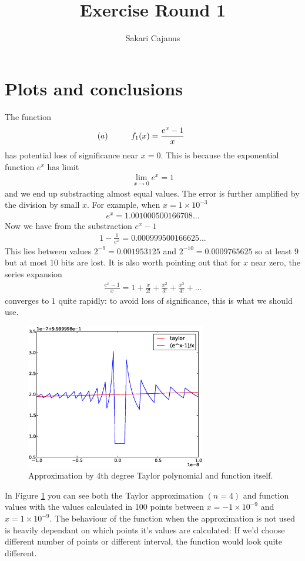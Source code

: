 \documentclass[a4paper,12pt]{scrartcl}
\author{Sakari Cajanus}
\title{Exercise Round 1}{Och samma på English}
\begin{document}
\maketitlepage
\clearpage
{}
\section{Plots and conclusions}
The function
\begin{align*}
\hspace{-10mm}(a)\hspace{10mm}f_1(x)=\frac{e^x -1}{x}
\end{align*}
has potential loss of significance near $x=0$. This is because the exponential function $e^x$ has limit
\begin{align*}
\lim_{x\to0}e^x=1
\end{align*}
and we end up substracting almost equal values. The error is further amplified by the division by small $x$. For example, when $x=1\times10^{-3}$ 
\begin{align*}
e^x=1.001000500166708...
\end{align*}
Now we have from the substraction $e^x-1$
\begin{align*}
1-\frac{1}{e^x}=0.000999500166625...
\end{align*}
This lies between values $2^{-9}=0.001953125$ and $2^{-10}=0.0009765625$ so at least 9 but at most 10 bits are lost. It is also worth pointing out that for $x$ near zero, the series expansion
\begin{align*}
\frac{e^x-1}{x}=1 + \frac{x}{2!} + \frac{x^2}{3!} + \frac{x^3}{4!} + \ldots
\end{align*}
converges to $1$ quite rapidly: to avoid loss of significance, this is what we should use.
\begin{figure}[h!]
  \centering
    \includegraphics[width=0.7\textwidth]{taylor}
  \caption{Approximation by 4th degree Taylor polynomial and function itself.}
  \label{fig:taylor}
\end{figure}
In Figure \ref{fig:taylor} you can see both the Taylor approximation $(n=4)$ and function values with the values calculated in 100 points between $x=-1\times10^{-9}$ and $x=1\times10^{-9}$. The behaviour of the function when the approximation is not used is heavily dependant on which points it's values are calculated: If we'd choose different number of points or different interval, the function would look quite different.
\end{document}
